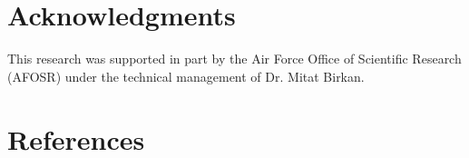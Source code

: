 \documentclass[review,3p,times]{elsarticle}
\begin{document}
\section*{Acknowledgments}
This research was supported in part by the Air Force Office of Scientific Research (AFOSR) under the technical management of Dr. Mitat Birkan.


\section*{References}



\renewcommand{\thefigure}{\arabic{figure}}
\renewcommand{\thetable}{\arabic{table}}

\clearpage
\end{document}
